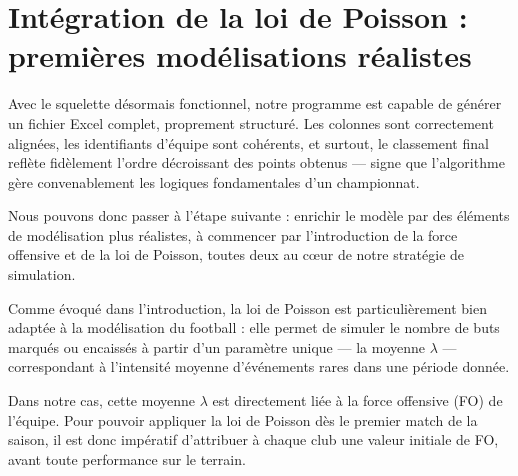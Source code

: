 \documentclass[12pt]{report}
\begin{document}
\begin{tcolorbox}[colback=white!95!gray, colframe=black, title=\textbf{Structure du fichier Excel}]
\begin{center}
\end{center}
\end{tcolorbox}

\section{Intégration de la loi de Poisson : premières modélisations réalistes}

Avec le squelette désormais fonctionnel, notre programme est capable de générer un fichier Excel complet, proprement structuré. Les colonnes sont correctement alignées, les identifiants d’équipe sont cohérents, et surtout, le classement final reflète fidèlement l’ordre décroissant des points obtenus — signe que l’algorithme gère convenablement les logiques fondamentales d’un championnat.

Nous pouvons donc passer à l’étape suivante : enrichir le modèle par des éléments de modélisation plus réalistes, à commencer par l’introduction de la force offensive et de la loi de Poisson, toutes deux au cœur de notre stratégie de simulation.

Comme évoqué dans l’introduction, la loi de Poisson est particulièrement bien adaptée à la modélisation du football : elle permet de simuler le nombre de buts marqués ou encaissés à partir d’un paramètre unique — la moyenne $\lambda$ --- correspondant à l’intensité moyenne d’événements rares dans une période donnée.

Dans notre cas, cette moyenne $\lambda$ est directement liée à la force offensive (FO) de l’équipe. Pour pouvoir appliquer la loi de Poisson dès le premier match de la saison, il est donc impératif d’attribuer à chaque club une valeur initiale de FO, avant toute performance sur le terrain.
\end{document}
